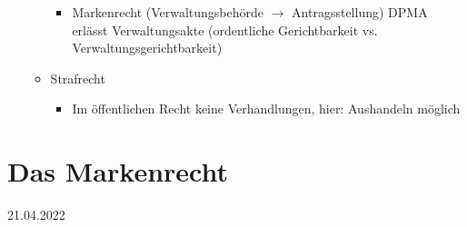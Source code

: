 \documentclass{report}
\begin{document}
\begin{itemize}
\begin{itemize}
\begin{itemize}
			\item Markenrecht (Verwaltungsbehörde $\rightarrow$ Antragsstellung)
			\newline DPMA erlässt Verwaltungsakte (ordentliche Gerichtbarkeit vs. Verwaltungsgerichtbarkeit)
		\end{itemize}
		\item Strafrecht
		\begin{itemize}
			\item Im öffentlichen Recht keine Verhandlungen, hier: Aushandeln möglich
		\end{itemize}
	\end{itemize}
\end{itemize}

\chapter{Das Markenrecht}
21.04.2022
\end{document}
